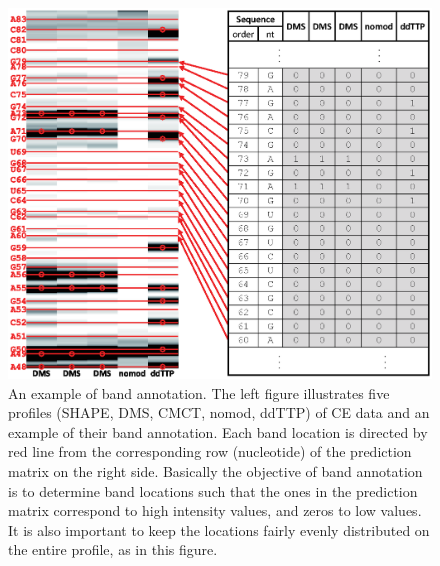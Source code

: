 \documentclass[letter]{bioinfo}
\newcommand{\hilightcolor}{red}
\newcommand{\hilight}[1]{{\color{\hilightcolor}#1}}
\begin{document}
\begin{figure}
\centering
\includegraphics[width=\linewidth]{figures/supp_band_annotation_example2}
\caption{\hilight{An example of band annotation. The left figure illustrates five profiles (SHAPE, DMS, CMCT, nomod, ddTTP) of CE data and an example of their band annotation. Each band location is directed by red line from the corresponding row (nucleotide) of the prediction matrix on the right side. Basically the objective of band annotation is to determine band locations such that the ones in the prediction matrix correspond to high intensity values, and zeros to low values. It is also important to keep the locations fairly evenly distributed on the entire profile, as in this figure. }}
\label{f:old_vs_new}
\end{figure}
\end{document}

